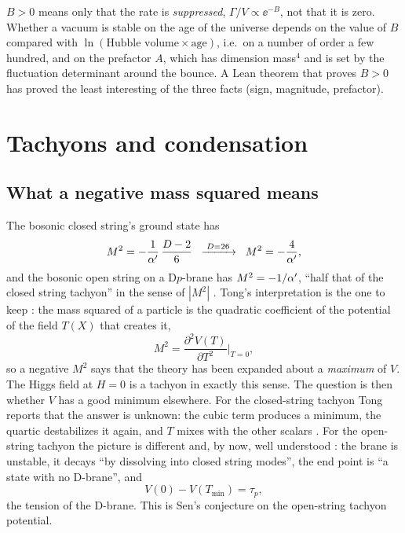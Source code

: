 \begin{pitfallbox}
$B>0$ means only that the rate is \emph{suppressed}, $\Gamma/V\propto\ee^{-B}$, not that it is
zero. Whether a vacuum is stable on the age of the universe depends on the value of $B$
compared with $\ln(\text{Hubble volume}\times\text{age})$, i.e.\ on a number of order a few
hundred, and on the prefactor $A$, which has dimension mass$^4$ and is set by the fluctuation
determinant around the bounce. A Lean theorem that proves $B>0$ has proved the least
interesting of the three facts (sign, magnitude, prefactor).
\end{pitfallbox}

\section{Tachyons and condensation}\label{sec:triad:tachyon}

\subsection{What a negative mass squared means}

The bosonic closed string's ground state has 
\begin{equation}\label{eq:triad:closedtachyon}
M^2=-\frac{1}{\alpha'}\,\frac{D-2}{6}\;\;\xrightarrow{\;D=26\;}\;\;M^2=-\frac4{\alpha'} ,
\end{equation}
and the bosonic open string on a D$p$-brane has $M^2=-1/\alpha'$, ``half that of the closed string
tachyon'' in the sense of $|M^2|$ . Tong's interpretation
is the one to keep : the mass squared of a particle is
the quadratic coefficient of the potential of the field $T(X)$ that creates it,
\begin{equation}\label{eq:triad:msq}
M^2=\frac{\partial^2V(T)}{\partial T^2}\Big|_{T=0},
\end{equation}
so a negative $M^2$ says that the theory has been expanded about a \emph{maximum} of $V$. The
Higgs field at $H=0$ is a tachyon in exactly this sense. The question is then whether $V$ has a
good minimum elsewhere. For the closed-string tachyon Tong reports that the answer is unknown:
the cubic term produces a minimum, the quartic destabilizes it again, and $T$ mixes with the
other scalars . For the open-string tachyon the picture is
different and, by now, well understood : the brane is
unstable, it decays ``by dissolving into closed string modes'', the end point is ``a state with
no D-brane'', and
\begin{equation}\label{eq:triad:tension}
V(0)-V(T_{\min})=\tau_p ,
\end{equation}
the tension of the D-brane. This is Sen's conjecture on the open-string tachyon potential.

